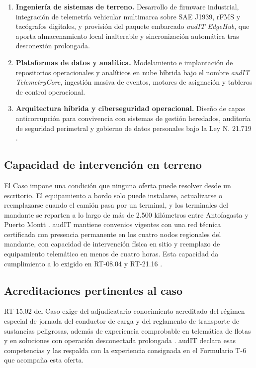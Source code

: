 \begin{enumerate}
    \item \textbf{Ingeniería de sistemas de terreno.} Desarrollo de firmware industrial,
    integración de telemetría vehicular multimarca sobre SAE J1939, rFMS y tacógrafos digitales, y
    provisión del paquete embarcado \emph{audIT EdgeHub}, que aporta almacenamiento local
    inalterable y sincronización automática tras desconexión prolongada.
    \item \textbf{Plataformas de datos y analítica.} Modelamiento e implantación de repositorios
    operacionales y analíticos en nube híbrida bajo el nombre \emph{audIT TelemetryCore}, ingestión
    masiva de eventos, motores de asignación y tableros de control operacional.
    \item \textbf{Arquitectura híbrida y ciberseguridad operacional.} Diseño de capas
    anticorrupción para convivencia con sistemas de gestión heredados, auditoría de seguridad
    perimetral y gobierno de datos personales bajo la Ley N.\textordmasculine{} 21.719
    \parencite{ley21719}.
\end{enumerate}

\subsection{Capacidad de intervención en terreno}

El Caso impone una condición que ninguna oferta puede resolver desde un escritorio. El equipamiento
a bordo solo puede instalarse, actualizarse o reemplazarse cuando el camión pasa por un terminal, y
los terminales del mandante se reparten a lo largo de más de 2.500 kilómetros entre Antofagasta y
Puerto Montt \parencite{bases_caso10_2026}. audIT mantiene convenios vigentes con una red técnica
certificada con presencia permanente en los cuatro nodos regionales del mandante, con capacidad de
intervención física en sitio y reemplazo de equipamiento telemático en menos de cuatro horas. Esta
capacidad da cumplimiento a lo exigido en RT-08.04 y RT-21.16 \parencite{bases_transversales_2026}.

\subsection{Acreditaciones pertinentes al caso}

RT-15.02 del Caso exige del adjudicatario conocimiento acreditado del régimen especial de jornada
del conductor de carga y del reglamento de transporte de sustancias peligrosas, además de
experiencia comprobable en telemática de flotas y en soluciones con operación desconectada
prolongada \parencite{bases_caso10_2026}. audIT declara esas competencias y las respalda con la
experiencia consignada en el Formulario T-6 que acompaña esta oferta.
